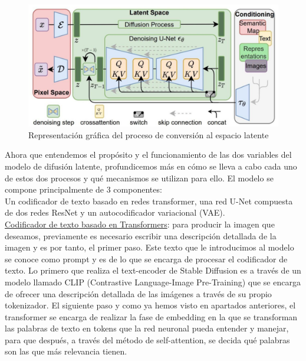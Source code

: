 \begin{figure}[h]
	\centering
	\includegraphics[width = 1
	\textwidth]{Imagenes/Vectorial/espaciolatente.png}
	\caption{Representación gráfica del proceso de conversión al espacio latente}
	\label{fig:latentspace}
\end{figure}

Ahora que entendemos el propósito y el funcionamiento de las dos variables del modelo de difusión latente, profundicemos más en cómo se lleva a cabo cada uno de estos dos procesos y qué mecanismos se utilizan para ello. El modelo se compone principalmente de 3 componentes:\\

Un codificador de texto basado en redes transformer, una red U-Net compuesta de dos redes ResNet y un autocodificador variacional (VAE).\\

\underline{Codificador de texto basado en Transformers}: para producir la imagen que deseamos, previamente es necesario escribir una descripción detallada de la imagen y es por tanto, el primer paso. Este texto que le introducimos al modelo se conoce como prompt y es de lo que se encarga de procesar el codificador de texto.  Lo primero que realiza el text-encoder de Stable Diffusion es a través de un modelo llamado CLIP (Contrastive Language-Image Pre-Training) que se encarga de ofrecer una descripción detallada de las imágenes a través de su propio tokenizador. El siguiente paso y como ya hemos visto en apartados anteriores, el transformer se encarga de realizar la fase de embedding en la que se transforman las palabras de texto en tokens que la red neuronal pueda entender y manejar, para que después, a través del método de self-attention, se decida qué palabras son las que más relevancia tienen.\\ 
 
